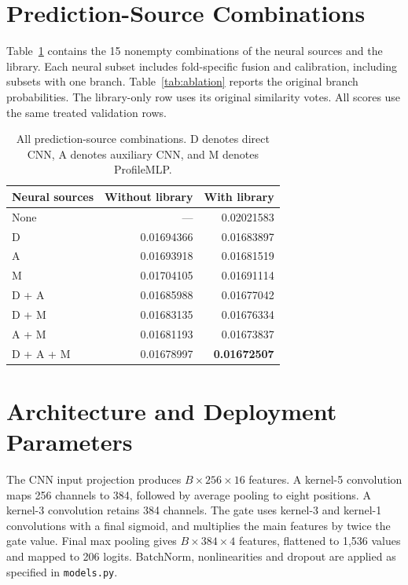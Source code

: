 \documentclass[journal]{IEEEtran}
\begin{document}
\appendices
\section{Prediction-Source Combinations}
\label{app:combinations}

Table~\ref{tab:all-combinations} contains the 15 nonempty combinations of the neural sources and the library. Each neural subset includes fold-specific fusion and calibration, including subsets with one branch. Table~\ref{tab:ablation} reports the original branch probabilities. The library-only row uses its original similarity votes. All scores use the same treated validation rows.

\begin{table}[!ht]
\caption{All prediction-source combinations. D denotes direct CNN, A denotes auxiliary CNN, and M denotes ProfileMLP.}
\label{tab:all-combinations}
\centering
\begin{tabularx}{\columnwidth}{Xrr}
\toprule
\textbf{Neural sources} & \textbf{Without library} & \textbf{With library} \\
\midrule
None & --- & 0.02021583 \\
D & 0.01694366 & 0.01683897 \\
A & 0.01693918 & 0.01681519 \\
M & 0.01704105 & 0.01691114 \\
D + A & 0.01685988 & 0.01677042 \\
D + M & 0.01683135 & 0.01676334 \\
A + M & 0.01681193 & 0.01673837 \\
D + A + M & 0.01678997 & \textbf{0.01672507} \\
\bottomrule
\end{tabularx}
\end{table}

\section{Architecture and Deployment Parameters}
\label{app:implementation}

The CNN input projection produces $B\times256\times16$ features. A kernel-5 convolution maps 256 channels to 384, followed by average pooling to eight positions. A kernel-3 convolution retains 384 channels. The gate uses kernel-3 and kernel-1 convolutions with a final sigmoid, and multiplies the main features by twice the gate value. Final max pooling gives $B\times384\times4$ features, flattened to 1,536 values and mapped to 206 logits. BatchNorm, nonlinearities and dropout are applied as specified in \texttt{models.py}.
\end{document}
